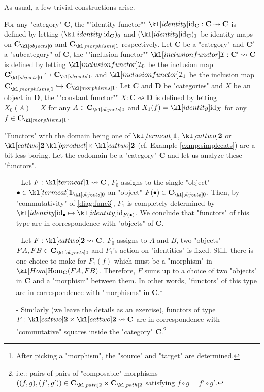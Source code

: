 \documentclass[main.tex]{subfiles}
\begin{document}
\begin{exmps}
	As usual, a few trivial constructions arise.
	\begin{enumerate}
		\itemAP For any "category" $\mathbf{C}$, the ""identity functor"" $\id_{\mathbf{C}}: \mathbf{C}\rightsquigarrow \mathbf{C}$ is defined by letting $(\id_{\mathbf{C}})_0$ and $(\id_{\mathbf{C}})_1$ be identity maps on $\obj{\mathbf{C}}$ and $\mor{\mathbf{C}}$ respectively.
		\itemAP Let $\mathbf{C}$ be a "category" and $\mathbf{C}'$ a "subcategory" of $\mathbf{C}$, the ""inclusion functor"" $\inclF: \mathbf{C}' \rightsquigarrow \mathbf{C}$ is defined by letting $\inclF_0$ be the inclusion map $\obj{\mathbf{C}'} \hookrightarrow \obj{\mathbf{C}}$ and $\inclF_1$ be the inclusion map $\mor{\mathbf{C}'} \hookrightarrow \mor{\mathbf{C}}$.
		\itemAP Let $\mathbf{C}$ and $\mathbf{D}$ be "categories" and $X$ be an object in $\mathbf{D}$, the ""constant functor"" $X: \mathbf{C} \rightsquigarrow \mathbf{D}$ is defined by letting $X_0(A) = X$ for any $A \in \obj{\mathbf{C}}$ and $X_1(f) = \id_X$ for any $f \in \mor{\mathbf{C}}$.
	\end{enumerate}
\end{exmps}
\begin{exmps}\label{exmp:simplediagrams}
    "Functors" with the domain being one of $\termcat$, $\cattwo$ or $\cattwo \product \cattwo$ (cf. Example \ref{exmp:simplecats}) are a bit less boring. Let the codomain be a "category" $\mathbf{C}$ and let us analyze these "functors".
    \begin{itemize}
        \item[-] Let $F: \termcat \rightsquigarrow \mathbf{C}$, $F_0$ assigns to the single "object" $\bullet \in \obj{\termcat}$ an "object" $F(\bullet) \in \obj{\mathbf{C}}$. Then, by "commutativity" of \eqref{diag:func3}, $F_1$ is completely determined by $\id_{\bullet} \mapsto \id_{F(\bullet)}$. We conclude that "functors" of this type are in correspondence with "objects" of $\mathbf{C}$.
        
        \item[-] Let $F: \cattwo \rightsquigarrow \mathbf{C}$, $F_0$ assigns to $A$ and $B$, two "objects" $FA, FB \in\obj{\mathbf{C}}$ and $F_1$'s action on "identities" is fixed. Still, there is one choice to make for $F_1(f)$ which must be a "morphism" in $\Hom_{\mathbf{C}}(FA, FB)$. Therefore, $F$ sums up to a choice of two "objects" in $\mathbf{C}$ and a "morphism" between them. In other words, "functors" of this type are in correspondence with "morphisms" in $\mathbf{C}$.\footnote{After picking a "morphism", the "source" and "target" are determined.}
        
        \item[-] Similarly (we leave the details as an exercise), functors of type $F: \cattwo\times \cattwo \rightsquigarrow \mathbf{C}$ are in correspondence with "commutative" squares inside the "category" $\mathbf{C}$.\footnote{i.e.: pairs of pairs of "composable" morphisms $((f,g), (f',g')) \in \mortwo{\mathbf{C}} \times \mortwo{\mathbf{C}}$ satisfying $f \circ g = f' \circ g'$.}
    \end{itemize}
\end{exmps}
\end{document}
